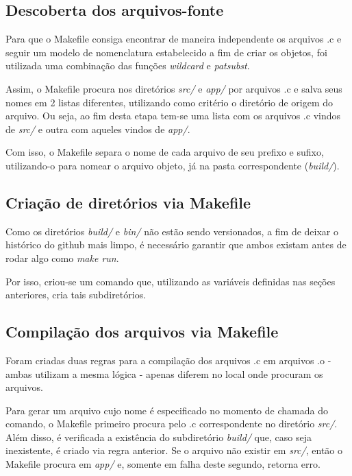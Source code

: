 \documentclass[12pt,a4paper]{article}
\begin{document}
\subsection{Descoberta dos arquivos-fonte}\label{subsec:makefile_descoberta_arq_fonte}
Para que o Makefile consiga encontrar de maneira independente os arquivos .c e seguir um modelo de
nomenclatura estabelecido a fim de criar os objetos, foi utilizada uma combinação das funções \emph{wildcard} e 
\emph{patsubst}.

Assim, o Makefile procura nos diretórios \emph{src/} e \emph{app/} por arquivos .c e salva seus 
nomes em 2 listas diferentes, utilizando como critério o diretório de origem do arquivo. Ou seja, 
ao fim desta etapa tem-se uma lista com os arquivos .c vindos de \emph{src/} e outra com aqueles
vindos de \emph{app/}.

Com isso, o Makefile separa o nome de cada arquivo de seu prefixo e sufixo, utilizando-o para nomear 
o arquivo objeto, já na pasta correspondente (\emph{build/}).

\subsection{Criação de diretórios via Makefile}\label{subsec:makefile_criacao_dir}
Como os diretórios \emph{build/} e \emph{bin/} não estão sendo versionados, a fim de deixar o histórico do 
github mais limpo, é necessário garantir que ambos existam antes de rodar algo como \emph{make run}.

Por isso, criou-se um comando que, utilizando as variáveis definidas nas seções anteriores, cria tais 
subdiretórios.

\subsection{Compilação dos arquivos via Makefile}\label{subsec:makefile_compilacao}
Foram criadas duas regras para a compilação dos arquivos .c em arquivos .o - ambas utilizam a mesma lógica - apenas
diferem no local onde procuram os arquivos.

Para gerar um arquivo cujo nome é especificado no momento de chamada do comando, o Makefile primeiro
procura pelo .c correspondente no diretório \emph{src/}. Além disso, é verificada a existência do subdiretório \emph{build/} que,
caso seja inexistente, é criado via regra anterior. Se o arquivo não existir em \emph{src/}, então o Makefile procura em
\emph{app/} e, somente em falha deste segundo, retorna erro.
\end{document}
